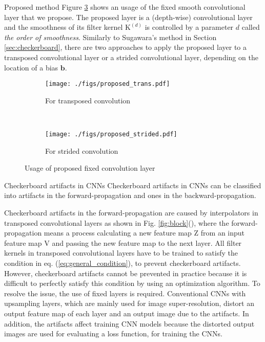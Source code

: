 \documentclass{article}
\makeatletter
\renewcommand\section{\@startsection{section}{1}{\z@}
                      {0.5ex \@plus 0ex \@minus -2ex}
                      {0.5ex \@plus 0ex}
                      {\normalfont\Large\bfseries}}
\renewcommand\subsection{\@startsection{subsection}{2}{\z@}
                      {0.5ex \@plus 0ex \@minus -2ex}
                      {0.5ex \@plus 0ex}
                      {\normalfont\large\bfseries}}
\newcommand{\myvector}[1]{\boldsymbol{#1}}
\newcommand{\mytensor}[1]{\boldsymbol{\mathrm{#1}}}
\makeatother
\begin{document}
\section{Proposed method}
  Figure \ref{fig:proposed} shows an usage of the fixed smooth convolutional layer
  that we propose.
  The proposed layer is a (depth-wise) convolutional layer
  and the smoothness of its filter kernel $\mytensor{K}^{(d)}$
  is controlled by a parameter $d$ called \textit{the order of smoothness}.
  Similarly to Sugawara's method in Section \ref{sec:checkerboard},
  there are two approaches to apply the proposed layer
  to a transposed convolutional layer or a strided convolutional layer,
  depending on the location of a bias $\myvector{b}$.
\begin{figure}[!t]
  \centering
  \begin{subfigure}[t]{0.95\hsize}
    \centering
    \texttt{[image: ./figs/proposed\_trans.pdf]}
    \caption{For transposed convolution \label{fig:proposed_up}}
  \end{subfigure}\\
  \begin{subfigure}[t]{0.95\hsize}
    \centering
    \texttt{[image: ./figs/proposed\_strided.pdf]}
    \caption{For strided convolution \label{fig:proposed_down}}
  \end{subfigure}
  \vspace{-2ex}
  \caption{Usage of proposed fixed convolution layer \label{fig:proposed}}
\end{figure}

\subsection{Checkerboard artifacts in CNNs}
  Checkerboard artifacts in CNNs can be classified into
  artifacts in the forward-propagation and ones in the backward-propagation.

  Checkerboard artifacts in the forward-propagation are caused by
  interpolators in transposed convolutional layers
  as shown in Fig. \ref{fig:block}(),
  where the forward-propagation means
  a process calculating a new feature map $\mytensor{Z}$
  from an input feature map $\mytensor{V}$
  and passing the new feature map to the next layer.
  All filter kernels in transposed convolutional layers
  have to be trained to satisfy the condition in eq. (\ref{eq:general_condition}),
  to prevent checkerboard artifacts.
  However, checkerboard artifacts cannot be prevented in practice
  because it is difficult to perfectly satisfy this condition
  by using an optimization algorithm.
  To resolve the issue, the use of fixed layers is required.
  Conventional CNNs with upsampling layers,
  which are mainly used for image super-resolution,
  distort an output feature map of each layer and an output image
  due to the artifacts.
  In addition, the artifacts affect training CNN models
  because the distorted output images are used for evaluating a loss function,
  for training the CNNs.
\end{document}
